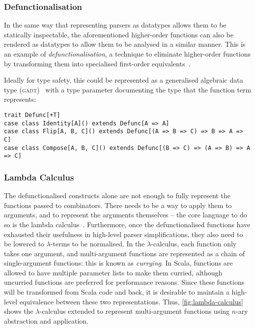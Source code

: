 \documentclass[../../main.tex]{subfiles}
\begin{document}
\subsubsection{Defunctionalisation}
In the same way that representing parsers as datatypes allows them to be statically inspectable, the aforementioned higher-order functions can also be rendered as datatypes to allow them to be analysed in a similar manner.
This is an example of \emph{defunctionalisation}, a technique to eliminate higher-order functions by transforming them into specialised first-order equivalents~\cite{reynolds_defunc_1972,danvy_defunctionalization_2001}.

Ideally for type safety, this could be represented as a generalised algebraic data type (\textsc{gadt})~\cite{cheney_gadt_2003} with a type parameter documenting the type that the function term represents:
\begin{verbatim}
trait Defunc[+T]
case class Identity[A]() extends Defunc[A => A]
case class Flip[A, B, C]() extends Defunc[(A => B => C) => B => A => C]
case class Compose[A, B, C]() extends Defunc[(B => C) => (A => B) => A => C]
\end{verbatim}


\subsubsection{Lambda Calculus}
The defunctionalised constructs alone are not enough to fully represent the functions passed to combinators.
There needs to be a way to apply them to arguments, and to represent the arguments themselves -- the core language to do so is the lambda calculus~\cite{church_lambda_1936}.
Furthermore, once the defunctionalised functions have exhausted their usefulness in high-level parser simplifications, they also need to be lowered to $\lambda$-terms to be normalised.
In the $\lambda$-calculus, each function only takes one argument, and multi-argument functions are represented as a chain of single-argument functions: this is known as \emph{currying}.
In Scala, functions are allowed to have multiple parameter lists to make them curried, although uncurried functions are preferred for performance reasons.
Since these functions will be transformed from Scala code and back, it is desirable to maintain a high-level equivalence between these two representations.
Thus, \cref{fig:lambda-calculus} shows the $\lambda$-calculus extended to represent multi-argument functions using $n$-ary abstraction and application.
\end{document}
